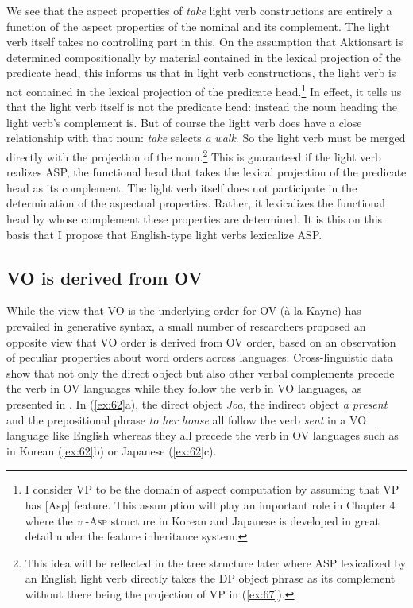 We see that the aspect properties of \textit{take} light verb constructions are entirely a function of the aspect properties of the nominal and its complement. The light verb itself takes no controlling part in this. On the assumption that Aktionsart is determined compositionally by material contained in the lexical projection of the predicate head, this informs us that in light verb constructions, the light verb is not contained in the lexical projection of the predicate head.\footnote{\textrm{I consider \ac{VP} to be the domain of aspect computation by assuming that \ac{VP} has [Asp] feature. This assumption will play an important role in Chapter 4 where the \textit{v} -A}\textrm{\textsc{sp}} \textrm{structure in Korean and Japanese is developed in great detail under the feature inheritance system.}} In effect, it tells us that the light verb itself is not the predicate head: instead the noun heading the light verb’s complement is. But of course the light verb does have a close relationship with that noun: \textit{take} selects \textit{a} \textit{walk}. So the light verb must be merged directly with the projection of the noun.\footnote{\textrm{This idea will be} \textrm{reflected in the tree structure later where \ac{ASP}} \textrm{lexicalized by an English light verb directly takes the \ac{DP} object phrase as its complement without there being the projection of \ac{VP} in (\ref{ex:67}).}} This is guaranteed if the light verb realizes \ac{ASP}, the functional head that takes the lexical projection of the predicate head as its complement. The light verb itself does not participate in the determination of the aspectual properties. Rather, it lexicalizes the functional head by whose complement these properties are determined. It is this on this basis that I propose that English-type light verbs lexicalize \ac{ASP}.

\subsection{VO is derived from OV}\label{ch3:sect:3.2.2}


While the view that \ac{VO} is the underlying order for \ac{OV} (à la Kayne) has prevailed in generative syntax, a small number of researchers proposed an opposite view that \ac{VO} order is derived from \ac{OV} order, based on an observation of peculiar properties about word orders across languages. Cross-linguistic data show that not only the direct object but also other verbal complements precede the verb in \ac{OV} languages while they follow the verb in \ac{VO} languages, as presented in . In (\ref{ex:62}a), the direct object \textit{Joa}, the indirect object \textit{a present} and the prepositional phrase \textit{to her house} all follow the verb \textit{sent} in a \ac{VO} language like English whereas they all precede the verb in \ac{OV} languages such as in Korean (\ref{ex:62}b) or Japanese (\ref{ex:62}c).

